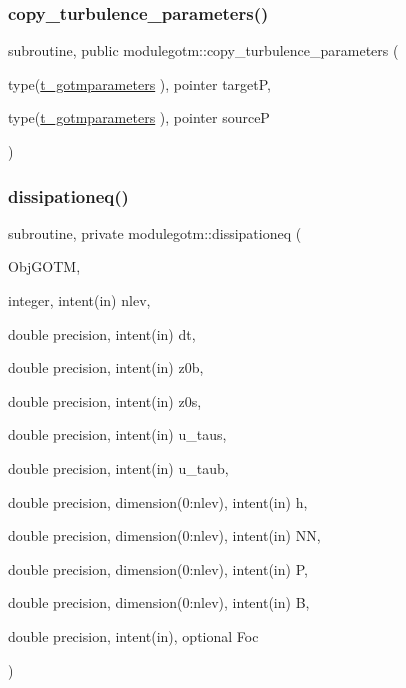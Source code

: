 \subsubsection{\texorpdfstring{copy\+\_\+turbulence\+\_\+parameters()}{copy\_turbulence\_parameters()}}
{\footnotesize\ttfamily subroutine, public modulegotm\+::copy\+\_\+turbulence\+\_\+parameters (\begin{DoxyParamCaption}\item[{type(\mbox{\hyperlink{structmodulegotm_1_1t__gotmparameters}{t\+\_\+gotmparameters}} ), pointer}]{targetP,  }\item[{type(\mbox{\hyperlink{structmodulegotm_1_1t__gotmparameters}{t\+\_\+gotmparameters}} ), pointer}]{sourceP }\end{DoxyParamCaption})}

\mbox{\label{namespacemodulegotm_ac05dd8d50f9ddc2c286122142f8a400e}} 
\subsubsection{\texorpdfstring{dissipationeq()}{dissipationeq()}}
{\footnotesize\ttfamily subroutine, private modulegotm\+::dissipationeq (\begin{DoxyParamCaption}\item[{}]{Obj\+G\+O\+TM,  }\item[{integer, intent(in)}]{nlev,  }\item[{double precision, intent(in)}]{dt,  }\item[{double precision, intent(in)}]{z0b,  }\item[{double precision, intent(in)}]{z0s,  }\item[{double precision, intent(in)}]{u\+\_\+taus,  }\item[{double precision, intent(in)}]{u\+\_\+taub,  }\item[{double precision, dimension(0\+:nlev), intent(in)}]{h,  }\item[{double precision, dimension(0\+:nlev), intent(in)}]{NN,  }\item[{double precision, dimension(0\+:nlev), intent(in)}]{P,  }\item[{double precision, dimension(0\+:nlev), intent(in)}]{B,  }\item[{double precision, intent(in), optional}]{Foc }\end{DoxyParamCaption})\hspace{0.3cm}{\ttfamily [private]}}

